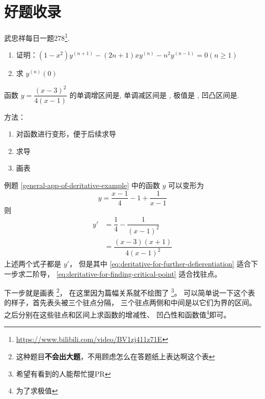 \section{好题收录}

\begin{example}
    武忠祥每日一题278\footnote{\url{https://www.bilibili.com/video/BV1zj411z71E}}.
    \begin{enumerate}
        \item 证明：$(1-x^2) y^{(n+1)} - (2n+1) xy^{(n)} - n^2 y^{(n - 1)} = 0 (n \geq 1)$
        \item 求 $y^{(n)}(0)$
    \end{enumerate}
\end{example}

\begin{example} \label{general-app-of-deritative-example}
    函数 $y = \dfrac{(x-3)^2}{4(x-1)}$ 的单调增区间是\underline{\quad\quad}, 
    单调减区间是 \underline{\quad\quad}, 极值是 \underline{\quad\quad}, 凹凸区间是\underline{\quad\quad}.

    \begin{center}
    \raisebox{0.5ex}{\rule{\textwidth}{0.3pt}}
    \end{center}

    方法：
    \begin{enumerate}
        \item 对函数进行变形，便于后续求导
        \item 求导
        \item 画表
    \end{enumerate}
    \cite[page 21, question 43]{w660ans}
\end{example}
例题 \ref{general-app-of-deritative-example}
中的函数 $y$ 可以变形为
\[
    y = \dfrac{x-1}{4} - 1 + \dfrac{1}{x-1}
\]
则
\begin{align}
    y' &= \dfrac{1}{4} - \dfrac{1}{(x-1)^2} \label{eq:deritative-for-further-defierentiation}\\
       &= \dfrac{(x-3)(x+1)}{4(x-1)^2}      \label{eq:deritative-for-finding-critical-point}
\end{align}
上述两个式子都是 $y'$， 但是其中 \ref{eq:deritative-for-further-defierentiation} 适合下一步求二阶导，
\ref{eq:deritative-for-finding-critical-point} 适合找驻点。

下一步就是画表
\footnote{这种题目\textbf{不会出大题}，不用顾虑怎么在答题纸上表达啊这个表}，
在这里因为篇幅关系就不绘图了
\footnote{希望有看到的人能帮忙提PR}。
可以简单说一下这个表的样子，首先表头被三个驻点分隔，
三个驻点两侧和中间是以它们为界的区间。
之后分别在这些驻点和区间上求函数的增减性、
凹凸性和函数值\footnote{为了求极值}即可。


